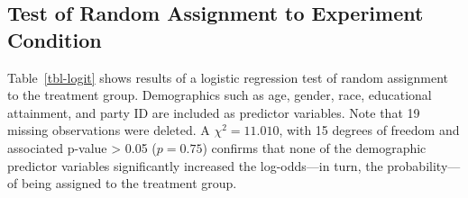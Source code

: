 \documentclass[
  12pt,
  letterpaper,
]{article}
\begin{document}
\begin{table}[H]
{}

\end{table}%

\subsection{Test of Random Assignment to Experiment
Condition}\label{test-of-random-assignment-to-experiment-condition}

Table~\ref{tbl-logit} shows results of a logistic regression test of
random assignment to the treatment group. Demographics such as age,
gender, race, educational attainment, and party ID are included as
predictor variables. Note that 19 missing observations were deleted. A
\(\chi^2 = 11.010\), with 15 degrees of freedom and associated p-value
\textgreater{} 0.05 (\(p = 0.75\)) confirms that none of the demographic
predictor variables significantly increased the log-odds---in turn, the
probability---of being assigned to the treatment group.
\end{document}
